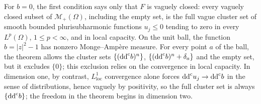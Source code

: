 For $b=0$, the first condition says only that $F$ is vaguely closed: every vaguely closed subset of $\mathcal M_+(\Omega)$, including the empty set, is the full vague cluster set of smooth bounded plurisubharmonic functions $u_j\leq0$ tending to zero in every $L^p(\Omega)$, $1\leq p<\infty$, and in local capacity. On the unit ball, the function $b=|z|^2-1$ has nonzero Monge--Amp\`ere measure. For every point $a$ of the ball, the theorem allows the cluster sets $\{(\mathrm{dd}^{\mathrm{c}} b)^n\}$, $\{(\mathrm{dd}^{\mathrm{c}} b)^n+\delta_a\}$ and the empty set, but it excludes $\{0\}$; this exclusion relies on the convergence in local capacity. In dimension one, by contrast, $L^1_{\mathrm{loc}}$ convergence alone forces $\mathrm{dd}^{\mathrm{c}} u_j\to\mathrm{dd}^{\mathrm{c}} b$ in the sense of distributions, hence vaguely by positivity, so the full cluster set is always $\{\mathrm{dd}^{\mathrm{c}} b\}$; the freedom in the theorem begins in dimension two.
